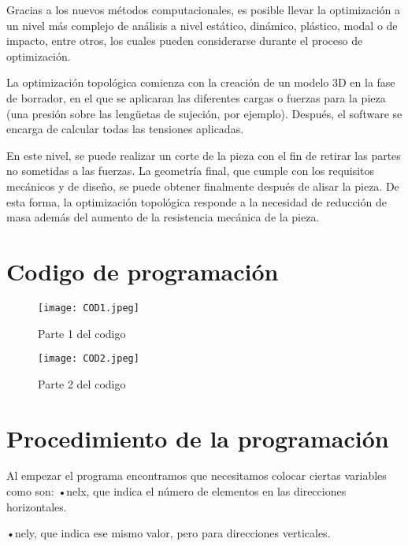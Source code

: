 \documentclass{article}
\begin{document}
Gracias a los nuevos m\'etodos computacionales, es posible llevar la optimizaci\'on a un nivel m\'as complejo de an\'alisis a nivel est\'atico, din\'amico, pl\'astico, modal o de impacto, entre otros, los cuales pueden considerarse durante el proceso de optimizaci\'on.

La optimización topol\'ogica comienza con la creaci\'on de un modelo 3D en la fase de borrador, en el que se aplicaran las diferentes cargas o fuerzas para la pieza (una presi\'on sobre las lengüetas de sujeci\'on, por ejemplo). Despu\'es, el software se encarga de calcular todas las tensiones aplicadas\cite{3}.

En este nivel, se puede realizar un corte de la pieza con el fin de retirar las partes no sometidas a las fuerzas. La geometr\'ia final, que cumple con los requisitos mec\'anicos y de diseño, se puede obtener finalmente despu\'es de alisar la pieza. De esta forma, la optimizaci\'on topol\'ogica responde a la necesidad de reducci\'on de masa además del aumento de la resistencia mec\'anica de la pieza.

\section{Codigo de  programación}

\begin{figure}[h] %
    \centering
    \texttt{[image: COD1.jpeg]} %
    \caption{Parte 1 del codigo} 
    \label{!}
\end{figure}

\begin{figure}[P] %
    \centering
    \texttt{[image: COD2.jpeg]} %
    \caption{Parte 2 del codigo}   
   \label{!}
\end{figure}


\section{Procedimiento de la programación}
Al empezar el programa encontramos que necesitamos colocar ciertas variables como son: •nelx, que indica el número de elementos en las direcciones 
horizontales.

•nely, que indica ese mismo valor, pero para direcciones verticales. 
\end{document}
